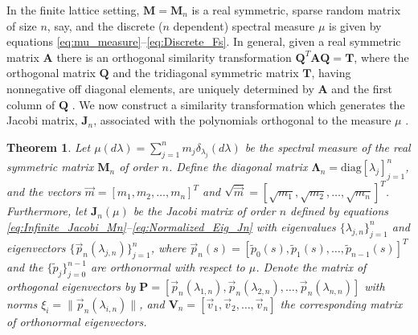\documentclass[english,12pt]{ttuthes}
\newtheorem{theorem}{Theorem}[chapter]
\begin{document}
In the finite lattice setting, $\mathbf{M}=\mathbf{M}_n$ is a real symmetric,
sparse random matrix \cite{Golden:CMP-467} of size $n$, say, and the
discrete ($n$ dependent) spectral measure $\mu$ is given by equations
\eqref{eq:mu_measure}--\eqref{eq:Discrete_Fs}. In general, given a
real symmetric matrix 
$\mathbf{A}$ there is an orthogonal similarity transformation
$\mathbf{Q}^T\mathbf{A}\mathbf{Q}=\mathbf{T}$, where the orthogonal
matrix $\mathbf{Q}$ and the tridiagonal symmetric matrix $\mathbf{T}$,
having nonnegative off diagonal elements, are uniquely determined by
$\mathbf{A}$ and the first column of $\mathbf{Q}$
\cite{Parlett:1980}. We now construct a similarity transformation
which generates the Jacobi matrix, $\mathbf{J}_n$, associated with the
polynomials orthogonal to the measure $\mu$ \cite{Gautschi:2004:OP}.
%
\begin{theorem}\label{thm:Mn_Jacobi_Theorem}
%
Let $\mu(d\lambda)=\sum_{j=1}^nm_j\delta_{\lambda_j}(d\lambda)$ be the spectral measure of the
real symmetric matrix $\mathbf{M}_n$ of order $n$. Define the diagonal 
matrix $\mathbf{\Lambda}_n=\textrm{diag}[\lambda_j]_{j=1}^n$, and the vectors
$\vec{m}=[m_1,m_2,\ldots,m_n]^T$ and
$\sqrt{\vec{m}}=[\sqrt{m_1},\sqrt{m_2},\ldots,\sqrt{m_n}]^T$. Furthermore, 
let $\mathbf{J}_n(\mu)$ be the Jacobi matrix of order $n$ defined by
equations \eqref{eq:Infinite_Jacobi_Mn}--\eqref{eq:Normalized_Eig_Jn}
with eigenvalues $\{\lambda_{j,n}\}_{j=1}^n$ and eigenvectors
$\{\vec{p}_n(\lambda_{j,n})\}_{j=1}^n$, where 
$\vec{p}_n(s)=[\tilde{p}_0(s),\tilde{p}_1(s),\ldots,\tilde{p}_{n-1}(s)]^T$
and the $\{\tilde{p}_j\}_{j=0}^{n-1}$ are orthonormal with respect to
$\mu$. Denote the matrix of orthogonal eigenvectors by
$\mathbf{P}=[\vec{p}_n(\lambda_{1,n}),\vec{p}_n(\lambda_{2,n}),\ldots,\vec{p}_n(\lambda_{n,n})]$     
with norms $\xi_i=\|\vec{p}_n(\lambda_{i,n})\|$, and
$\mathbf{V}_n=[\vec{v}_1,\vec{v}_2,\ldots,\vec{v}_n]$ the corresponding 
matrix of orthonormal eigenvectors.


\end{theorem}
\end{document}
